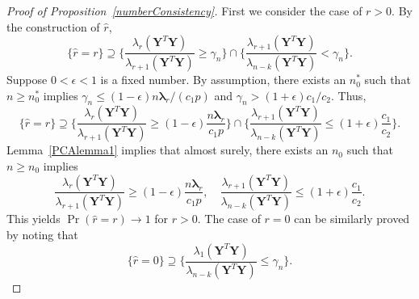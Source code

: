 \documentclass[12pt]{article} %
\newcommand{\bY}{\mathbf{Y}}
\newcommand{\bfsym}[1]{\ensuremath{\boldsymbol{#1}}}
\def\blambda {\bfsym {\lambda}}
\theoremstyle{definition}
\begin{document}
\begin{appendices}
\begin{proof}[Proof of Proposition~\ref{numberConsistency}]
    First we consider the case of $r>0$. By the construction of $\hat{r}$,
    $$
    \{\hat{r}=r\}\supseteq 
    \{\frac{\lambda_{r}(\bY^T \bY)}{\lambda_{r+1}(\bY^T \bY)}\geq \gamma_n\}
    \cap
    \{\frac{\lambda_{r+1}(\bY^T \bY)}{\lambda_{n-k}(\bY^T \bY)}< \gamma_n\}.
    $$
    Suppose $0<\epsilon< 1$ is a fixed number.
    By assumption, there exists an $n_0^*$ such that $n\geq n_0^*$ implies $\gamma_n\leq (1-\epsilon)n\blambda_r/(c_1 p)$ and $\gamma_n> (1+\epsilon) c_1/c_2 $. Thus,
    $$
    \{\hat{r}=r\}\supseteq 
    \{\frac{\lambda_{r}(\bY^T \bY)}{\lambda_{r+1}(\bY^T \bY)}\geq (1-\epsilon)\frac{n\blambda_r}{c_1 p}\}
    \cap
    \{\frac{\lambda_{r+1}(\bY^T \bY)}{\lambda_{n-k}(\bY^T \bY)}\leq (1+\epsilon) \frac{c_1}{c_2} \}.
    $$
     Lemma~\ref{PCAlemma1} implies that almost surely, there exists an $n_0$ such that $n\geq n_0$ implies
    $$\frac{\lambda_r(\bY^T \bY)}{\lambda_{r+1}(\bY^T \bY)}\geq (1-\epsilon)\frac{n\blambda_r}{c_1 p},
    \quad
    \frac{\lambda_{r+1}(\bY^T \bY)}{\lambda_{n-k}(\bY^T \bY)}\leq (1+\epsilon)\frac{c_1}{c_2}.
    $$
    This yields $\Pr(\hat{r}=r)\to 1$ for $r>0$.
    The case of $r=0$ can be similarly proved by noting that
    $$
    \{\hat{r}=0\}\supseteq 
    \{\frac{\lambda_{1}(\bY^T \bY)}{\lambda_{n-k}(\bY^T \bY)}\leq \gamma_n\}.
    $$
\end{proof}


\end{appendices}
\end{document}
